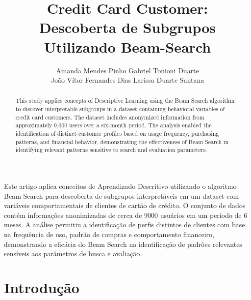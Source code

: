 \documentclass[12pt]{article}
\title{
    Credit Card Customer: \\
    Descoberta de Subgrupos Utilizando Beam-Search
}
\author{
  Amanda Mendes Pinho\inst{1}
  Gabriel Tonioni Duarte\inst{2}\\
  João Vítor Fernandes Dias\inst{2}
  Larissa Duarte Santana\inst{2}
}
\begin{document}
\maketitle

\begin{center}
\end{center}

\begin{abstract}
    This study applies concepts of Descriptive Learning using the Beam Search algorithm to discover interpretable subgroups in a dataset containing behavioral variables of credit card customers. The dataset includes anonymized information from approximately 9,000 users over a six-month period. The analysis enabled the identification of distinct customer profiles based on usage frequency, purchasing patterns, and financial behavior, demonstrating the effectiveness of Beam Search in identifying relevant patterns sensitive to search and evaluation parameters.
\end{abstract}

\begin{resumo}
    Este artigo aplica conceitos de Aprendizado Descritivo utilizando o algoritmo Beam Search para descoberta de subgrupos interpretáveis em um dataset com variáveis comportamentais de clientes de cartão de crédito. O conjunto de dados contém informações anonimizadas de cerca de 9000 usuários em um período de 6 meses. A análise permitiu a identificação de perfis distintos de clientes com base na frequência de uso, padrão de compras e comportamento financeiro, demonstrando a eficácia do Beam Search na identificação de padrões relevantes sensíveis aos parâmetros de busca e avaliação.
\end{resumo}

\section{Introdução}

\end{document}
